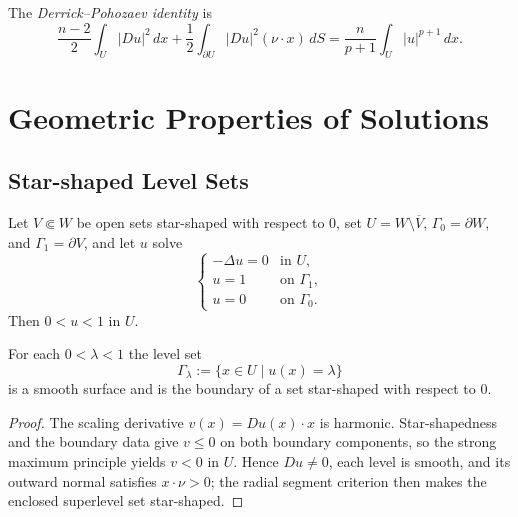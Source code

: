 \begin{remark}
\label{rem:derrick-pohozaev-identity-name}
The \textit{Derrick--Pohozaev identity} is
\[
\frac{n-2}{2}\int_U|Du|^2\,dx
+\frac12\int_{\partial U}|Du|^2(\nu\cdot x)\,dS
=\frac{n}{p+1}\int_U|u|^{p+1}\,dx.
\tag{18}
\]
\end{remark}

\section{Geometric Properties of Solutions}
\label{sec:geometric-properties-of-solutions}

\subsection{Star-shaped Level Sets}
\label{sec:star-shaped-level-sets}

Let $V\Subset W$ be open sets star-shaped with respect to $0$, set
$U=W\setminus\overline V$, $\Gamma_0=\partial W$, and $\Gamma_1=\partial V$, and let $u$ solve
\[
\begin{cases}
-\Delta u=0 & \text{in }U,\\
u=1 & \text{on }\Gamma_1,\\
u=0 & \text{on }\Gamma_0.
\end{cases}
\tag{1}
\]
Then $0<u<1$ in $U$.

\begin{theorem}
\label{thm:star-shaped-level-sets}
For each $0 < \lambda < 1$ the level set
\[
\Gamma_\lambda := \{x \in U \mid u(x) = \lambda\}
\]
is a smooth surface and is the boundary of a set star-shaped with respect to $0$.
\end{theorem}

\begin{proof}
\sketch The scaling derivative $v(x)=Du(x)\cdot x$ is harmonic. Star-shapedness and the boundary data give $v\leq0$ on both boundary components, so the strong maximum principle yields $v<0$ in $U$. Hence $Du\neq0$, each level is smooth, and its outward normal satisfies $x\cdot\nu>0$; the radial segment criterion then makes the enclosed superlevel set star-shaped.
\end{proof}

